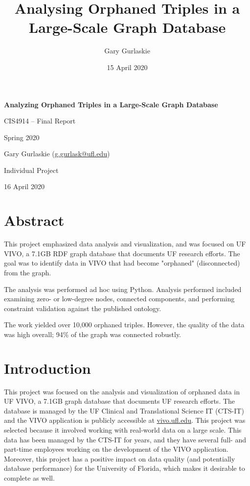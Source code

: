 \documentclass[11pt]{article}
\title{Analysing Orphaned Triples in a Large-Scale Graph Database}
\author{Gary Gurlaskie}
\date{15 April 2020}
\begin{document}
\begin{titlepage}
 \centering
 \vspace*{1in}
 \begin{Large}\bfseries
  Analyzing Orphaned Triples in a Large-Scale Graph Database\par
 \end{Large}

 \vspace*{0.2in}

  CIS4914 -- Final Report\par
  Spring 2020\par

  \vspace*{0.2in}
  
  Gary Gurlaskie (\url{g.gurlask@ufl.edu})\par
  Individual Project\par
  16 April 2020\par
\end{titlepage}

\section*{Abstract}
This project emphasized data analysis and visualization, and was focused on UF VIVO, a 7.1GB RDF graph database that documents UF research efforts. The goal was to identify data in VIVO that had become "orphaned" (disconnected) from the graph.

The analysis was performed ad hoc using Python. Analysis performed included examining zero- or low-degree nodes, connected components, and performing constraint validation against the published ontology.

The work yielded over 10,000 orphaned triples. However, the quality of the data was high overall; 94\% of the graph was connected robustly.

\section*{Introduction}
This project was focused on the analysis and visualization of orphaned data in UF VIVO, a 7.1GB graph database that documents UF research efforts. The database is managed by the UF Clinical and Translational Science IT (CTS-IT) and the VIVO application is publicly accessible at \url{vivo.ufl.edu}. This project was selected because it involved working with real-world data on a large scale. This data has been managed by the CTS-IT for years, and they have several full- and part-time employees working on the development of the VIVO application. Moreover, this project has a positive impact on data quality (and potentially database performance) for the University of Florida, which makes it desirable to complete as well.
\end{document}
